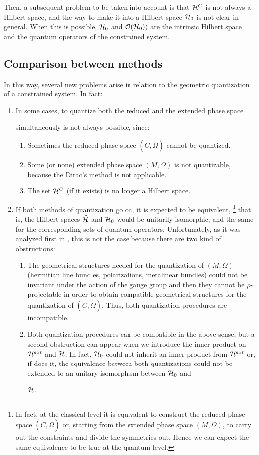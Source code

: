 \documentclass[12pt]{article}
\theoremstyle{plain}
\def\ben{\begin{enumerate}}
\def\een{\end{enumerate}}
\def\Hr{\tilde{\cal H}}
\def\He{{\cal H}^{ext}}
\def\Hc{{\cal H}^C}
\def\rps{(\tilde C,\tilde\Omega )}
\begin{document}
Then, a subsequent problem to be taken into account is that $\Hc$
is not always a Hilbert space, and the way to make it
into a Hilbert space ${\cal H}_0$ is not clear in general.
When this is possible, ${\cal H}_0$ and ${\cal O}({\cal H}_0))$
are the intrinsic Hilbert space and the quantum operators of the
constrained system.



\subsection{Comparison between methods}


In this way, several new problems arise in relation to the geometric
quantization
of a constrained system. In fact:
\begin{enumerate}
\item
In some cases, to quantize both the reduced and the extended phase space

simultaneously is not always possible, since:
\ben
\item
Sometimes the reduced phase space $\rps$ cannot be quantized.
\item
Some (or none) extended phase space $(M,\Omega )$ is not quantizable,
because the Dirac's method is not applicable.
\item
The set $\Hc$ (if it exists) is no longer a Hilbert space.
\een
\item
If both methods of quantization go on, it is expected to be equivalent,%
\footnote{
In fact, at the classical level it is equivalent to construct the
reduced phase space $\rps$
or, starting from the extended phase space $(M,\Omega )$,
to carry out the constraints and divide the symmetries out.
Hence we can expect the same equivalence to be true at the quantum
level.
}
that is, the Hilbert spaces $\Hr$ and ${\cal H}_0$ would be unitarily
isomorphic;
and the same for the corresponding sets of quantum operators.
Unfortunately, as it was analyzed first in \cite{AH-82}, this is not the
case because there are two kind of obstructions:
\begin{enumerate}
\item
The geometrical structures needed for the quantization of $(M,\Omega )$
(hermitian line bundles, polarizations, metalinear bundles)
could not be invariant under the action of the gauge group and
then they cannot be $\rho$-projectable in order to obtain
compatible geometrical structures for the quantization of $\rps$.
Thus, both quantization procedures are incompatible.
\item
Both quantization procedures can be compatible in the above sense,
but a second obstruction can appear when we introduce
the inner product on $\He$ and $\Hr$.
In fact,  ${\cal H}_0$ could not inherit an inner product from $\He$ or,
if does it,
the equivalence between both quantizations
could not be extended to an unitary isomorphism between ${\cal H}_0$ and

$\Hr$.
\end{enumerate}
\end{enumerate}
\end{document}
